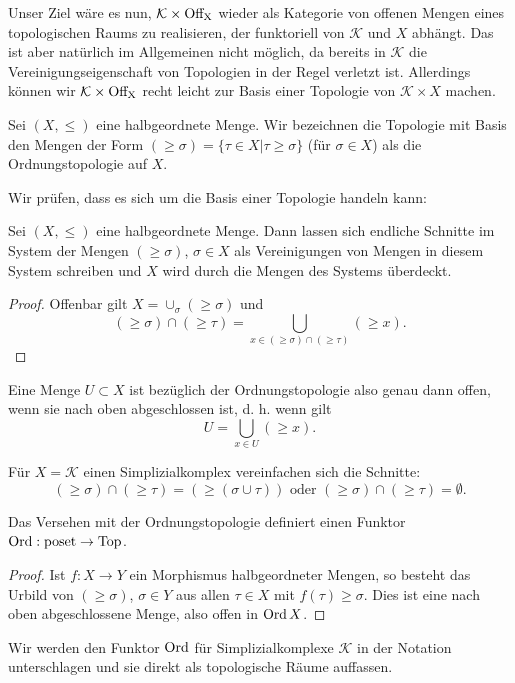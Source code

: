 Unser Ziel wäre es nun, $\mathcal{K} \times \operatorname{Off_X}$ wieder als
Kategorie von offenen Mengen eines topologischen Raums zu realisieren,
der funktoriell von $\mathcal{K}$ und $X$ abhängt. Das ist aber
natürlich im Allgemeinen nicht möglich, da bereits in $\mathcal{K}$
die Vereinigungseigenschaft von Topologien in der Regel verletzt
ist. Allerdings können wir $\mathcal{K} \times \operatorname{Off_X}$ recht leicht zur
Basis einer Topologie von $\mathcal{K} \times X$ machen.
\begin{defn}
  Sei $(X, \leq)$ eine halbgeordnete Menge.  Wir bezeichnen die
  Topologie mit Basis den Mengen der Form $(\geq \sigma) = \{\tau \in
  X | \tau \geq \sigma\}$ (für $\sigma \in X$) als die
  Ordnungstopologie auf $X$.
\end{defn}
Wir prüfen, dass es sich um die Basis einer Topologie handeln kann:
\begin{lemma}
  Sei $(X, \leq)$ eine halbgeordnete Menge. Dann lassen sich endliche
  Schnitte im System der Mengen $(\geq \sigma)$, $\sigma \in X$ als
  Vereinigungen von Mengen in diesem System schreiben und $X$ wird
  durch die Mengen des Systems überdeckt.
\end{lemma}
\begin{proof}
  Offenbar gilt $X = \cup_\sigma (\geq \sigma)$ und
  \[ (\geq \sigma) \cap (\geq \tau)
  = \bigcup_{x \in (\geq \sigma) \cap (\geq \tau)} (\geq x).
  \]
\end{proof}
Eine Menge $U \subset X$ ist bezüglich der Ordnungstopologie also
genau dann offen, wenn sie nach oben abgeschlossen ist, d. h. wenn
gilt
\[ U = \bigcup_{x \in U} (\geq x). \]

Für $X = \mathcal{K}$ einen Simplizialkomplex vereinfachen sich die
Schnitte:
\begin{equation} \label{eq:simp-comp-meets}
  (\geq \sigma) \cap (\geq \tau) = (\geq (\sigma \cup \tau))
  \text{ oder }
  (\geq \sigma) \cap (\geq \tau) = \emptyset.
\end{equation}

\begin{lemma} \label{ord-functor}
  Das Versehen mit der Ordnungstopologie definiert einen Funktor
  $\operatorname{Ord}: \operatorname{poset} \to \operatorname{Top}$.
\end{lemma}
\begin{proof}
  Ist $f: X \to Y$ ein Morphismus halbgeordneter Mengen, so besteht
  das Urbild von $(\geq \sigma)$, $\sigma \in Y$ aus allen $\tau \in
  X$ mit $f(\tau) \geq \sigma$. Dies ist eine nach oben abgeschlossene
  Menge, also offen in $\operatorname{Ord} X$.
\end{proof}
Wir werden den Funktor $\operatorname{Ord}$ für Simplizialkomplexe $\mathcal{K}$ in
der Notation unterschlagen und sie direkt als topologische Räume
auffassen.

